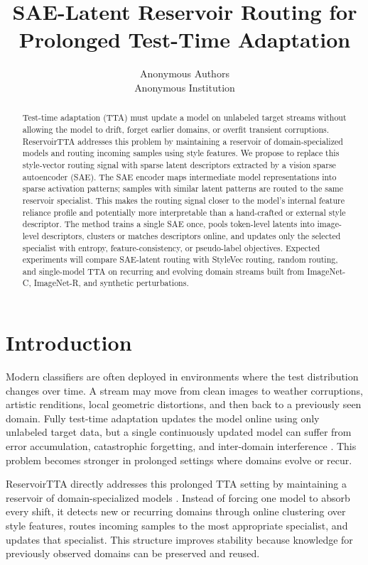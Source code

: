 \documentclass{article}
\title{SAE-Latent Reservoir Routing for Prolonged Test-Time Adaptation}
\author{
    Anonymous Authors\\
    Anonymous Institution
}
\begin{document}
\maketitle

\begin{abstract}
Test-time adaptation (TTA) must update a model on unlabeled target streams without allowing the model to drift, forget earlier domains, or overfit transient corruptions. ReservoirTTA addresses this problem by maintaining a reservoir of domain-specialized models and routing incoming samples using style features. We propose to replace this style-vector routing signal with sparse latent descriptors extracted by a vision sparse autoencoder (SAE). The SAE encoder maps intermediate model representations into sparse activation patterns; samples with similar latent patterns are routed to the same reservoir specialist. This makes the routing signal closer to the model's internal feature reliance profile and potentially more interpretable than a hand-crafted or external style descriptor. The method trains a single SAE once, pools token-level latents into image-level descriptors, clusters or matches descriptors online, and updates only the selected specialist with entropy, feature-consistency, or pseudo-label objectives. Expected experiments will compare SAE-latent routing with StyleVec routing, random routing, and single-model TTA on recurring and evolving domain streams built from ImageNet-C, ImageNet-R, and synthetic perturbations.
\end{abstract}

\section{Introduction}

Modern classifiers are often deployed in environments where the test distribution changes over time. A stream may move from clean images to weather corruptions, artistic renditions, local geometric distortions, and then back to a previously seen domain. Fully test-time adaptation updates the model online using only unlabeled target data, but a single continuously updated model can suffer from error accumulation, catastrophic forgetting, and inter-domain interference \cite{wang2021tent,niu2022eata,wang2022cotta}. This problem becomes stronger in prolonged settings where domains evolve or recur.

ReservoirTTA directly addresses this prolonged TTA setting by maintaining a reservoir of domain-specialized models \cite{vray2025reservoirtta}. Instead of forcing one model to absorb every shift, it detects new or recurring domains through online clustering over style features, routes incoming samples to the most appropriate specialist, and updates that specialist. This structure improves stability because knowledge for previously observed domains can be preserved and reused.
\end{document}

